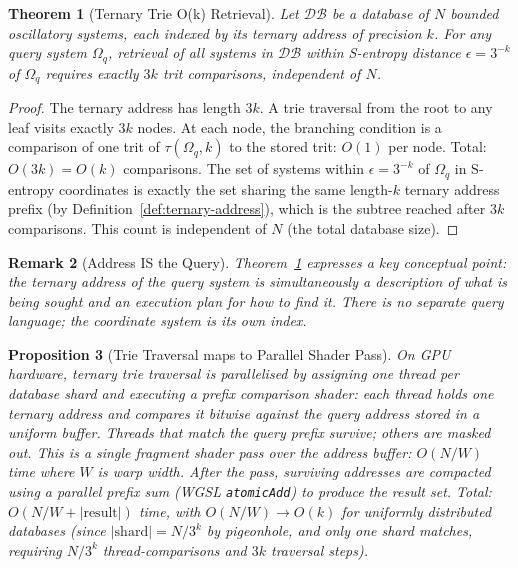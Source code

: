 \documentclass[10pt,twocolumn]{article}
\newtheorem{theorem}{Theorem}[section]
\newtheorem{proposition}[theorem]{Proposition}
\newtheorem{remark}[theorem]{Remark}
\begin{document}
\begin{theorem}[Ternary Trie O(k) Retrieval]
\label{thm:trie-ok}
Let $\mathcal{DB}$ be a database of $N$ bounded oscillatory systems,
each indexed by its ternary address of precision $k$.
For any query system $\Omega_q$, retrieval of all systems in $\mathcal{DB}$
within S-entropy distance $\epsilon = 3^{-k}$ of $\Omega_q$ requires
exactly $3k$ trit comparisons, independent of $N$.
\end{theorem}

\begin{proof}
The ternary address has length $3k$.
A trie traversal from the root to any leaf visits exactly $3k$ nodes.
At each node, the branching condition is a comparison of one trit
of $\tau(\Omega_q, k)$ to the stored trit: $O(1)$ per node.
Total: $O(3k) = O(k)$ comparisons.
The set of systems within $\epsilon = 3^{-k}$ of $\Omega_q$ in
S-entropy coordinates is exactly the set sharing the same length-$k$
ternary address prefix (by Definition~\ref{def:ternary-address}),
which is the subtree reached after $3k$ comparisons.
This count is independent of $N$ (the total database size).
\end{proof}

\begin{remark}[Address IS the Query]
Theorem~\ref{thm:trie-ok} expresses a key conceptual point:
the ternary address of the query system is simultaneously
a description of what is being sought and an execution plan
for how to find it. There is no separate query language;
the coordinate system is its own index.
\end{remark}

\begin{proposition}[Trie Traversal maps to Parallel Shader Pass]
\label{prop:trie-shader}
On GPU hardware, ternary trie traversal is parallelised by
assigning one thread per database shard and executing a
\emph{prefix comparison shader}: each thread holds one ternary address
and compares it bitwise against the query address stored in a uniform buffer.
Threads that match the query prefix survive; others are masked out.
This is a single fragment shader pass over the address buffer:
$O(N/W)$ time where $W$ is warp width.
After the pass, surviving addresses are compacted using a parallel prefix sum
(WGSL \texttt{atomicAdd}) to produce the result set.
Total: $O(N/W + |\text{result}|)$ time, with $O(N/W) \to O(k)$
for uniformly distributed databases (since $|\text{shard}| = N / 3^k$
by pigeonhole, and only one shard matches, requiring
$N / 3^k$ thread-comparisons and $3k$ traversal steps).
\end{proposition}
\end{document}
